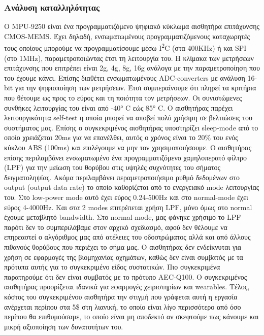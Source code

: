 \documentclass{article}
\begin{document}
\subsubsection{Ανάλυση καταλληλότητας}
O MPU-9250 είναι ένα προγραμματιζόμενο ψηφιακό κύκλωμα αισθητήρα επιτάχυνσης CMOS-MEMS. Έχει δηλαδή, ενσωματωμένους προγραμματιζόμενους καταχωρητές τους οποίους μπορούμε να προγραμματίσουμε μέσω Ι\textsuperscript{2}C (στα 400KHz) ή και SPI (στο 1MHz), παραμετροποιώντας έτσι τη λειτουργία του. Η κλίμακα των μετρήσεων επιτάχυνσης που επιτρέπει είναι \textpm 2g, \textpm 4g, \textpm 8g, \textpm 16g ανάλογα με την παραμετροποίηση που του έχουμε κάνει. Επίσης διαθέτει ενσωματωμένους ADC-converters με ανάλυση 16-bit για την ψηφιοποίηση των μετρήσεων. Έτσι συμπεραίνουμε ότι πληρεί τα κριτήρια που θέτουμε ως προς το εύρος και τη ποιότητα τον μετρήσεων. Οι συνιστώμενες συνθήκες λειτουργίας του είναι από \ang{-40} C εώς \ang{+85} C. Ο αισθητήρας παρέχει λειτουργικότητα self-test η οποία μπορεί να αποβεί πολύ χρήσιμη σε βελτιώσεις του συστήματος μας. Επίσης ο συγκεκριμένος αισθητήρας υποστηρίζει sleep-mode από το οποίο χρειάζεται 20ms για να επανέλθει, αυτός ο χρόνος είναι το 20\% του ενός κύκλου ABS (100ms) και επιλέγουμε να μην τον χρησιμοποιήσουμε. Ο αισθητήρας επίσης περιλαμβάνει ενσωματωμένο ένα προγραμματιζόμενο χαμηλοπερατό φίλτρο (LPF) για την μείωση του θορύβου στις υψηλές συχνότητες του σήματος δειγματοληψίας. Ακόμα περιλαμβάνει περαμετροποιήσιμο ρυθμό δεδομένων στο output (output data rate) το οποίο καθορίζεται από το ενεργειακό mode λειτουργίας του. Στο low-power mode αυτό έχει εύρος 0.24-500Hz και στο normal-mode έχει εύρος 4-4000Hz. Και στα 2 modes επιτρέπεται χρήση LPF, μόνο όμως στο normal έχουμε μεταβλητό bandwidth. Στο normal-mode, μας φάνηκε χρήσιμο το LPF παρότι δεν το συμπεριλάβαμε στον αρχικό σχεδιασμό, αφού δεν θέλουμε να επηρεαστεί ο αλγόριθμος μας από ατέλειες του οδοστρώματος αλλά και από άλλους πιθανούς θορύβους που περιέχει το σήμα μας. Ο αισθητήρας δεν ενδείκνυται για χρήση σε εφαρμογές της βιομηχανίας οχημάτων, καθώς δεν είναι συμβατός με τα πρότυπα αυτής για το συγκεκριμένο είδος συστατικών. Πιο συγκεκριμένα παρατηρούμε ότι δεν είναι συμβατός με το πρότυπο AEC-Q100. Ο συγκεκριμένος αισθητήρας προορίζεται ιδανικά για εφαρμογές χειριστηρίων και wearables. Τέλος, κόστος του συγκεκριμένου αισθητήρα την στιγμή που γράφεται αυτή η εργασία ανέρχεται περίπου στα 5\$ στη λιανική, το οποίο είναι λίγο περισσότερο από όσο περίπου θα επιθυμούσαμε, το οποίο είναι μη αποδεκτό αν σκεφτούμε πως κάνουμε και μικρή αξιοποίηση των δυνατοτήτων του.
\end{document}
